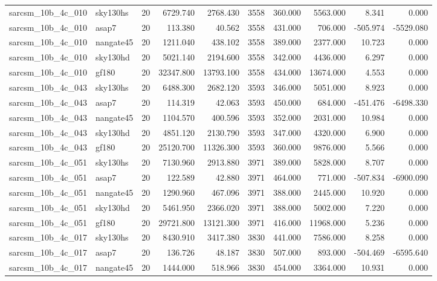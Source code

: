 \documentclass{article}
\begin{document}
\begin{longtable}{llrrrrrrrr}
sarcsm\_10b\_4c\_010 & sky130hs & 20 & 6729.740 & 2768.430 & 3558 & 360.000 & 5563.000 & 8.341 & 0.000 \\
sarcsm\_10b\_4c\_010 & asap7 & 20 & 113.380 & 40.562 & 3558 & 431.000 & 706.000 & -505.974 & -5529.080 \\
sarcsm\_10b\_4c\_010 & nangate45 & 20 & 1211.040 & 438.102 & 3558 & 389.000 & 2377.000 & 10.723 & 0.000 \\
sarcsm\_10b\_4c\_010 & sky130hd & 20 & 5021.140 & 2194.600 & 3558 & 342.000 & 4436.000 & 6.297 & 0.000 \\
sarcsm\_10b\_4c\_010 & gf180 & 20 & 32347.800 & 13793.100 & 3558 & 434.000 & 13674.000 & 4.553 & 0.000 \\
sarcsm\_10b\_4c\_043 & sky130hs & 20 & 6488.300 & 2682.120 & 3593 & 346.000 & 5051.000 & 8.923 & 0.000 \\
sarcsm\_10b\_4c\_043 & asap7 & 20 & 114.319 & 42.063 & 3593 & 450.000 & 684.000 & -451.476 & -6498.330 \\
sarcsm\_10b\_4c\_043 & nangate45 & 20 & 1104.570 & 400.596 & 3593 & 352.000 & 2031.000 & 10.984 & 0.000 \\
sarcsm\_10b\_4c\_043 & sky130hd & 20 & 4851.120 & 2130.790 & 3593 & 347.000 & 4320.000 & 6.900 & 0.000 \\
sarcsm\_10b\_4c\_043 & gf180 & 20 & 25120.700 & 11326.300 & 3593 & 360.000 & 9876.000 & 5.566 & 0.000 \\
sarcsm\_10b\_4c\_051 & sky130hs & 20 & 7130.960 & 2913.880 & 3971 & 389.000 & 5828.000 & 8.707 & 0.000 \\
sarcsm\_10b\_4c\_051 & asap7 & 20 & 122.589 & 42.880 & 3971 & 464.000 & 771.000 & -507.834 & -6900.090 \\
sarcsm\_10b\_4c\_051 & nangate45 & 20 & 1290.960 & 467.096 & 3971 & 388.000 & 2445.000 & 10.920 & 0.000 \\
sarcsm\_10b\_4c\_051 & sky130hd & 20 & 5461.950 & 2366.020 & 3971 & 388.000 & 5002.000 & 7.220 & 0.000 \\
sarcsm\_10b\_4c\_051 & gf180 & 20 & 29721.800 & 13121.300 & 3971 & 416.000 & 11968.000 & 5.236 & 0.000 \\
sarcsm\_10b\_4c\_017 & sky130hs & 20 & 8430.910 & 3417.380 & 3830 & 441.000 & 7586.000 & 8.258 & 0.000 \\
sarcsm\_10b\_4c\_017 & asap7 & 20 & 136.726 & 48.187 & 3830 & 507.000 & 893.000 & -504.469 & -6595.640 \\
sarcsm\_10b\_4c\_017 & nangate45 & 20 & 1444.000 & 518.966 & 3830 & 454.000 & 3364.000 & 10.931 & 0.000 \\

\end{longtable}
\end{document}

